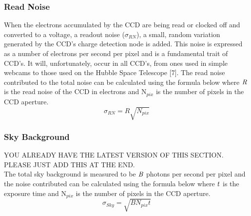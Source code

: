 \documentclass[pdf,color]{UoBnote}
\begin{document}
\subsubsection{Read Noise}
When the electrons accumulated by the CCD are being read or clocked off and converted to a voltage, a readout noise ($\sigma$$_{RN}$), a small, random variation generated by the CCD’s charge detection node is added. This noise is expressed as a number of electrons per second per pixel and is a fundamental trait of CCD’s. It will, unfortunately, occur in all CCD’s, from ones used in simple webcams to those used on the Hubble Space Telescope [7]. The read noise contributed to the total noise can be calculated using the formula below where $\it{R}$ is the read noise of the CCD in electrons and N$_{pix}$ is the number of pixels in the CCD aperture.\\
\begin{equation}
\sigma_{RN} = R\sqrt{N_{pix}}
\end{equation}

\subsubsection{Sky Background}
YOU ALREADY HAVE THE LATEST VERSION OF THIS SECTION. PLEASE JUST ADD THIS AT THE END.\\
The total sky background is measured to be $\it{B}$ photons per second per pixel and the noise contributed can be calculated using the formula below where $\it{t}$ is the exposure time and N$_{pix}$ is the number of pixels in the CCD aperture.\\
\begin{equation}
\sigma_{Sky} = \sqrt{BN_{pix}t}
\end{equation}
\end{document}
